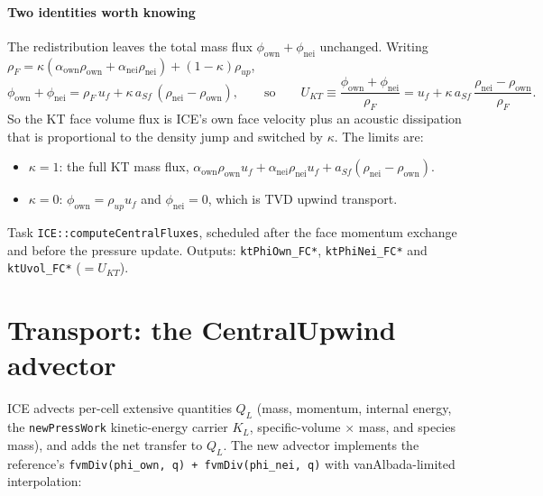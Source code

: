 \documentclass[11pt]{article}
\newcommand{\code}[1]{\texttt{\small #1}}
\newcommand{\own}{\mathrm{own}}
\newcommand{\nei}{\mathrm{nei}}
\begin{document}
\paragraph{Two identities worth knowing}
The redistribution leaves the total mass flux $\phi_\own+\phi_\nei$ unchanged. Writing
$\rho_F = \kappa(\alpha_\own\rho_\own+\alpha_\nei\rho_\nei)+(1-\kappa)\rho_{up}$,
\begin{equation}
  \phi_\own+\phi_\nei = \rho_F\,u_f + \kappa\,a_{Sf}\,(\rho_\nei-\rho_\own),
  \qquad\text{so}\qquad
  U_{KT} \equiv \frac{\phi_\own+\phi_\nei}{\rho_F} = u_f + \kappa\,a_{Sf}\,\frac{\rho_\nei-\rho_\own}{\rho_F}.
  \label{eq:ukt}
\end{equation}
So the KT face volume flux is ICE's own face velocity plus an acoustic dissipation that
is proportional to the density jump and switched by $\kappa$. The limits are:
\begin{itemize}
  \item $\kappa=1$: the full KT mass flux, $\alpha_\own\rho_\own u_f + \alpha_\nei\rho_\nei u_f + a_{Sf}(\rho_\nei-\rho_\own)$.
  \item $\kappa=0$: $\phi_\own=\rho_{up}u_f$ and $\phi_\nei=0$, which is TVD upwind transport.
\end{itemize}

\begin{incode}
Task \code{ICE::computeCentralFluxes}, scheduled after the face momentum exchange and before
the pressure update. Outputs: \code{ktPhiOwn\_FC*}, \code{ktPhiNei\_FC*} and \code{ktUvol\_FC*}
($=U_{KT}$).
\end{incode}

\section{Transport: the CentralUpwind advector}\label{sec:adv}

ICE advects per-cell extensive quantities $Q_L$ (mass, momentum, internal energy,
the \code{newPressWork} kinetic-energy carrier $K_L$, specific-volume $\times$ mass, and
species mass), and adds the net transfer to $Q_L$. The new advector implements the
reference's \code{fvmDiv(phi\_own, q) + fvmDiv(phi\_nei, q)} with vanAlbada-limited
interpolation:
\end{document}
